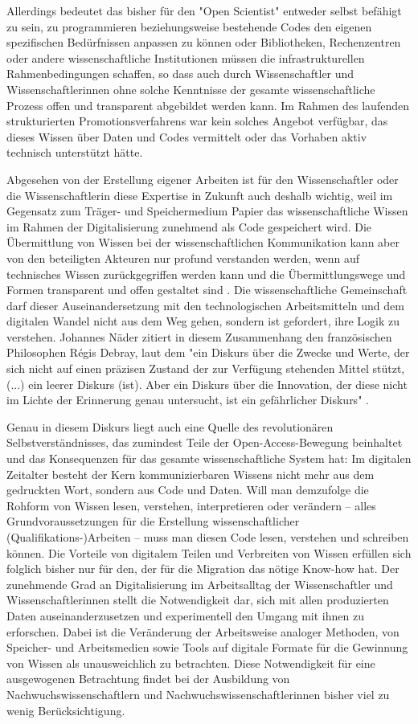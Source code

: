 Allerdings bedeutet das bisher für den "Open Scientist" entweder selbst befähigt zu sein, zu programmieren beziehungsweise bestehende Codes den eigenen spezifischen Bedürfnissen anpassen zu können oder Bibliotheken, Rechenzentren oder andere wissenschaftliche Institutionen müssen die infrastrukturellen Rahmenbedingungen schaffen, so dass auch durch Wissenschaftler und Wissenschaftlerinnen ohne solche Kenntnisse der gesamte wissenschaftliche Prozess offen und transparent abgebildet werden kann. Im Rahmen des laufenden strukturierten Promotionsverfahrens war kein solches Angebot verfügbar, das dieses Wissen über Daten und Codes vermittelt oder das Vorhaben aktiv technisch unterstützt hätte.

Abgesehen von der Erstellung eigener Arbeiten ist für den Wissenschaftler oder die Wissenschaftlerin diese Expertise in Zukunft auch deshalb wichtig, weil im Gegensatz zum Träger- und Speichermedium Papier das wissenschaftliche Wissen im Rahmen der Digitalisierung zunehmend als Code gespeichert wird. Die Übermittlung von Wissen bei der wissenschaftlichen Kommunikation kann aber von den beteiligten Akteuren nur profund verstanden werden, wenn auf technisches Wissen zurückgegriffen werden kann und die Übermittlungswege und Formen transparent und offen gestaltet sind \cite{Davis_2011}. Die wissenschaftliche Gemeinschaft darf dieser Auseinandersetzung mit den technologischen Arbeitsmitteln und dem digitalen Wandel nicht aus dem Weg gehen, sondern ist gefordert, ihre Logik zu verstehen. Johannes Näder zitiert in diesem Zusammenhang den französischen Philosophen Régis Debray, laut dem "ein Diskurs über die Zwecke und Werte, der sich nicht auf einen präzisen Zustand der zur Verfügung stehenden Mittel stützt, (...) ein leerer Diskurs (ist). Aber ein Diskurs über die Innovation, der diese nicht im Lichte der Erinnerung genau untersucht, ist ein gefährlicher Diskurs" \cite[:117]{Naeder_2010} \cite[:246]{Debray_2003}.

Genau in diesem Diskurs liegt auch eine Quelle des revolutionären Selbstverständnisses, das zumindest Teile der Open-Access-Bewegung beinhaltet und das Konsequenzen für das gesamte wissenschaftliche System hat: Im digitalen Zeitalter besteht der Kern kommunizierbaren Wissens nicht mehr aus dem gedruckten Wort, sondern aus Code und Daten. Will man demzufolge die Rohform von Wissen lesen, verstehen, interpretieren oder verändern – alles Grundvoraussetzungen für die Erstellung wissenschaftlicher (Qualifikations-)Arbeiten – muss man diesen Code lesen, verstehen und schreiben können. Die Vorteile von digitalem Teilen und Verbreiten von Wissen erfüllen sich folglich bisher nur für den, der für die Migration das nötige Know-how hat. Der zunehmende Grad an Digitalisierung im Arbeitsalltag der Wissenschaftler und Wissenschaftlerinnen stellt die Notwendigkeit dar, sich mit allen produzierten Daten auseinanderzusetzen und experimentell den Umgang mit ihnen zu erforschen. Dabei ist die Veränderung der Arbeitsweise analoger Methoden, von Speicher- und Arbeitsmedien sowie Tools auf digitale Formate für die Gewinnung von Wissen als unausweichlich zu betrachten. Diese Notwendigkeit für eine ausgewogenen Betrachtung findet bei der Ausbildung von Nachwuchswissenschaftlern und Nachwuchswissenschaftlerinnen bisher viel zu wenig Berücksichtigung.

